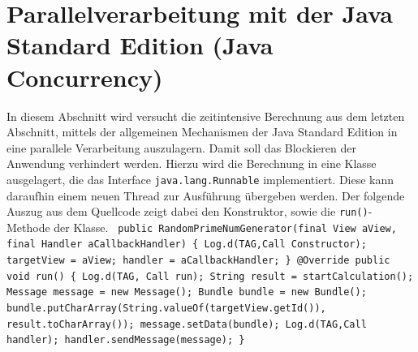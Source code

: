 \documentclass[12pt,oneside,a4paper,bibtotoc,liststotoc]{scrreprt}
\begin{document}
\section{Parallelverarbeitung mit der Java Standard Edition (Java Concurrency)}
In diesem Abschnitt wird versucht die zeitintensive Berechnung aus dem letzten Abschnitt, mittels der allgemeinen Mechanismen der Java Standard Edition in eine parallele Verarbeitung auszulagern. Damit soll das Blockieren der Anwendung verhindert werden. Hierzu wird die Berechnung in eine Klasse ausgelagert, die das Interface \texttt{java.lang.Runnable} implementiert. Diese kann daraufhin einem neuen Thread zur Ausführung übergeben werden. Der folgende Auszug aus dem Quellcode zeigt dabei den Konstruktor, sowie die \texttt{run()}- Methode der Klasse.\newline\newline\newline\newline\newline\newline
\texttt{
public RandomPrimeNumGenerator(final View aView, final Handler aCallbackHandler)\newline
\{ \newline
 Log.d(TAG,\grqq Call Constructor\grqq );\newline
 targetView = aView;\newline
 handler = aCallbackHandler;\newline
\} \newline
  @Override\newline
  public void run()\newline
  \{ \newline
     Log.d(TAG, \grqq Call run\grqq);\newline
       String result = startCalculation();\newline
       Message message = new Message();\newline
       Bundle bundle = new Bundle();\newline
       bundle.putCharArray(String.valueOf(targetView.getId()), result.toCharArray());\newline
       message.setData(bundle);\newline
       Log.d(TAG,\grqq Call handler\grqq );\newline
       handler.sendMessage(message);\newline
   \} \newline\newline
} \newline
\end{document}
